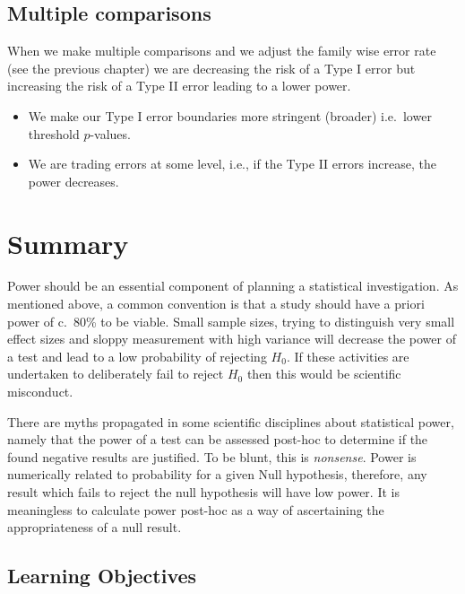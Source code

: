 \documentclass[
  oneside]{krantz}
\providecommand{\tightlist}{%
  \setlength{\itemsep}{0pt}\setlength{\parskip}{0pt}}
\begin{document}
\hypertarget{multiple-comparisons-1}{%
\subsection{Multiple comparisons}\label{multiple-comparisons-1}}

When we make multiple comparisons and we adjust the family wise error rate (see the previous chapter) we are decreasing the risk of a Type I error but increasing the risk of a Type II error leading to a lower power.

\begin{itemize}
\tightlist
\item
  We make our Type I error boundaries more stringent (broader) i.e.~lower threshold \(p\)-values.
\item
  We are trading errors at some level, i.e., if the Type II errors increase, the power decreases.
\end{itemize}

\hypertarget{SUMpower}{%
\section{Summary}\label{SUMpower}}

Power should be an essential component of planning a statistical investigation. As mentioned above, a common convention is that a study should have a priori power of c.~80\% to be viable. Small sample sizes, trying to distinguish very small effect sizes and sloppy measurement with high variance will decrease the power of a test and lead to a low probability of rejecting \(H_0\). If these activities are undertaken to deliberately fail to reject \(H_0\) then this would be scientific misconduct.

There are myths propagated in some scientific disciplines about statistical power, namely that the power of a test can be assessed post-hoc to determine if the found negative results are justified. To be blunt, this is \emph{nonsense}. Power is numerically related to probability for a given Null hypothesis, therefore, any result which fails to reject the null hypothesis will have low power. It is meaningless to calculate power post-hoc as a way of ascertaining the appropriateness of a null result.

\hypertarget{learning-objectives-1}{%
\subsection{Learning Objectives}\label{learning-objectives-1}}
\end{document}
